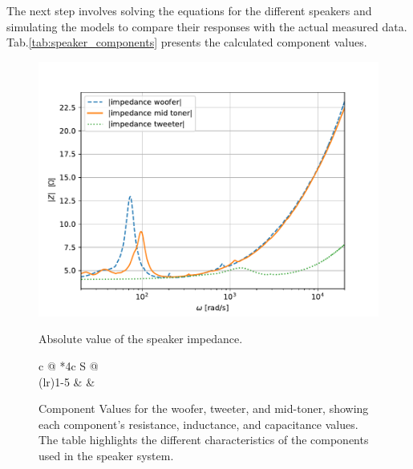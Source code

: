 The next step involves solving the equations for the different speakers and simulating the models to compare their responses with the actual measured data. Tab.\ref{tab:speaker_components} presents the calculated component values.
\begin{figure}[H]
    \centering
    \begin{minipage}{0.5\textwidth}
        \centering
        \includegraphics[width=\linewidth]{TU Delft Booming Bass Project Report/figures/FilterGroup/abs_impedance_speakers (2).pdf}
        \captionsetup{justification=raggedright, labelfont=bf}
        \caption{Absolute value of the speaker impedance.}
        \label{fig:abs_speakers}
    \end{minipage}\hfill
    \begin{minipage}{0.5\textwidth}
        \centering
        \captionsetup{justification=raggedright, labelfont=bf}
        \caption{Component Values for the woofer, tweeter, and mid-toner, showing each component's resistance, inductance, and capacitance values. The table highlights the different characteristics of the components used in the speaker system.}
        \begin{threeparttable}
          \centering
          \begin{tabular}{c @{\hspace{12pt}} *4{c} S @{\hspace{12pt}}}
            \toprule
             \\
            \cmidrule(lr){1-5}
            & &  \\

\end{tabular}
\end{threeparttable}
\end{minipage}
\end{figure}
